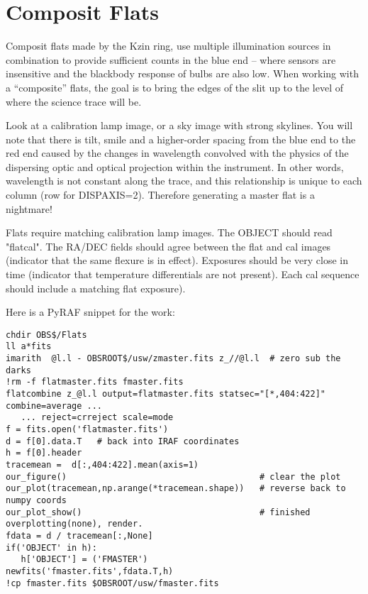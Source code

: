 \section{Composit Flats}

Composit flats made by the Kzin ring, use multiple illumination
sources in combination to provide sufficient counts in the blue end --
where sensors are insensitive and the blackbody response of bulbs are
also low.  When working with a ``composite'' flats, the goal is to
bring the edges of the slit  up to the level
of where the science trace will be.

Look at a calibration lamp image, or a sky image with strong skylines.
You will note that there is tilt, smile and a higher-order spacing
from the blue end to the red end caused by the changes in wavelength
convolved with the physics of the dispersing optic and optical
projection within the instrument. In other words, wavelength is
not constant along the trace, and this relationship is unique to
each column (row for DISPAXIS=2). Therefore generating a master
flat is a nightmare!

Flats require matching calibration lamp images. The OBJECT should
read "flatcal". The RA/DEC fields should agree between the flat
and cal images (indicator that the same flexure is in effect). Exposures
should be very close in time (indicator that temperature differentials
are not present). Each cal sequence should include a matching flat
exposure).


Here is a PyRAF snippet for the work:

\begingroup \fontsize{10pt}{10pt}
\selectfont
\begin{verbatim} 
chdir OBS$/Flats
ll a*fits
imarith  @l.l - OBSROOT$/usw/zmaster.fits z_//@l.l  # zero sub the darks
!rm -f flatmaster.fits fmaster.fits
flatcombine z_@l.l output=flatmaster.fits statsec="[*,404:422]" combine=average ...
   ... reject=crreject scale=mode
f = fits.open('flatmaster.fits')
d = f[0].data.T   # back into IRAF coordinates
h = f[0].header
tracemean =  d[:,404:422].mean(axis=1)
our_figure()                                      # clear the plot
our_plot(tracemean,np.arange(*tracemean.shape))   # reverse back to numpy coords
our_plot_show()                                   # finished overplotting(none), render.
fdata = d / tracemean[:,None]
if('OBJECT' in h):
   h['OBJECT'] = ('FMASTER')
newfits('fmaster.fits',fdata.T,h)
!cp fmaster.fits $OBSROOT/usw/fmaster.fits
\end{verbatim}
\endgroup

